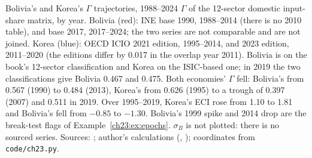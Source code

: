 \documentclass[../structural_economics_book.tex]{subfiles}
\begin{document}
\begin{vizpanel}{Bolivia's and Korea's $\Gamma$ trajectories, 1988--2024}
\vspace{-0.5em}
\small $\Gamma$ of the 12-sector domestic input-share matrix, by year. Bolivia (red): INE base 1990, 1988--2014 (there is no 2010 table), and base 2017, 2017--2024; the two series are not comparable and are not joined. Korea (blue): OECD ICIO 2021 edition, 1995--2014, and 2023 edition, 2011--2020 (the editions differ by 0.017 in the overlap year 2011). Bolivia is on the book's 12-sector classification and Korea on the ISIC-based one; in 2019 the two classifications give Bolivia 0.467 and 0.475. Both economies' $\Gamma$ fell: Bolivia's from 0.567 (1990) to 0.484 (2013), Korea's from 0.626 (1995) to a trough of 0.397 (2007) and 0.511 in 2019. Over 1995--2019, Korea's ECI rose from 1.10 to 1.81 and Bolivia's fell from $-0.85$ to $-1.30$. Bolivia's 1999 spike and 2014 drop are the break-test flags of Example~\ref{ch23:ex:epochs}. $\sigma_B$ is not plotted: there is no sourced series. Sources: \citet{ine2026sut,oecd2021icio,oecd2023icio,growthlab2026atlas}; author's calculations (, ); coordinates from \texttt{code/ch23.py}.
\end{vizpanel}
\end{document}
